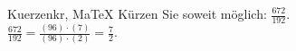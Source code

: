 \begin{MAufgabe}{Kuerzen}{kr, MaTeX}
K\"urzen Sie soweit m\"oglich: $\frac{672}{192}$.\\ 
\ifLsg\MLoesung
\quad $\frac{672}{192}=\frac{(96)\cdot(7)}{(96)\cdot(2)}=\frac{7}{2}$.\else\relax\fi
 \end{MAufgabe}
